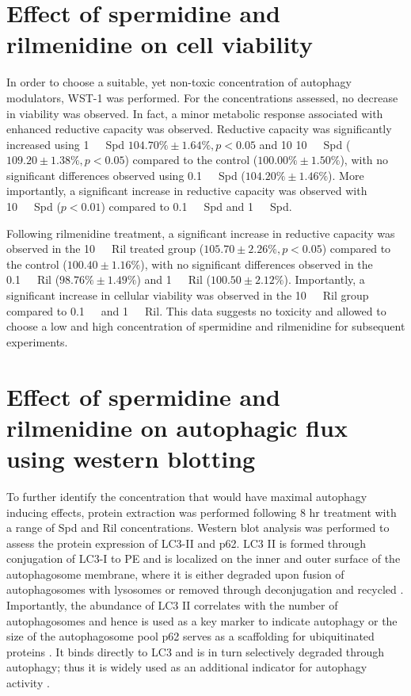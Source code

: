 \section{Effect of spermidine and rilmenidine on cell viability}
In order to choose a suitable, yet non-toxic concentration of autophagy modulators, WST-1 was performed. For the concentrations assessed, no decrease in viability was observed. In fact, a minor metabolic response associated with enhanced reductive capacity was observed. Reductive capacity was significantly increased using \SI{1}{\mu\Molar}\ Spd $104.70\% \pm 1.64\%, p < 0.05$ and 10 \SI{10}{\mu\Molar}\ Spd ($109.20 \pm 1.38\%, p < 0.05$) compared to the control ($100.00\% \pm 1.50\%$), with no significant differences observed using \SI{0.1}{\mu\Molar}\ Spd ($104.20\% \pm 1.46\%$). More importantly, a significant increase in reductive capacity was observed with \SI{10}{\mu\Molar}\ Spd ($p < 0.01$) compared to \SI{0.1}{\mu\Molar}\ Spd and \SI{1}{\mu\Molar}\ Spd.

Following rilmenidine treatment, a significant increase in reductive capacity was observed in the \SI{10}{\mu\Molar}\ Ril treated group ($105.70 \pm 2.26\%, p < 0.05$) compared to the control ($100.40 \pm 1.16\%$), with no significant differences observed in the \SI{0.1}{\mu\Molar}\ Ril ($98.76\% \pm 1.49\%$) and \SI{1}{\mu\Molar}\ Ril ($100.50 \pm 2.12\%$). Importantly, a significant increase in cellular viability was observed in the \SI{10}{\mu\Molar}\ Ril group compared to \SI{0.1}{\mu\Molar}\ and \SI{1}{\mu\Molar}\ Ril. This data suggests no toxicity and allowed to choose a low and high concentration of spermidine and rilmenidine for subsequent experiments.

\section{Effect of spermidine and rilmenidine on autophagic flux using western blotting}
To further identify the concentration that would have maximal autophagy inducing effects, protein extraction was performed following 8 hr treatment with a range of Spd and Ril concentrations. Western blot analysis was performed to assess the protein expression of LC3-II and p62. LC3 II is formed through conjugation of LC3-I to PE and is localized on the inner and outer surface of the autophagosome membrane, where it is either degraded upon fusion of autophagosomes with lysosomes or removed through deconjugation and recycled \citep{kabeya2000}. Importantly, the abundance of LC3 II correlates with the number of autophagosomes and hence is used as a key marker to indicate autophagy or the size of the autophagosome pool \citep{loos2014} p62 serves as a scaffolding for ubiquitinated proteins \citep{sahani2014}. It binds directly to LC3 and is in turn selectively degraded through autophagy; thus it is widely used as an additional indicator for autophagy activity \citep{pankiv2007}.

